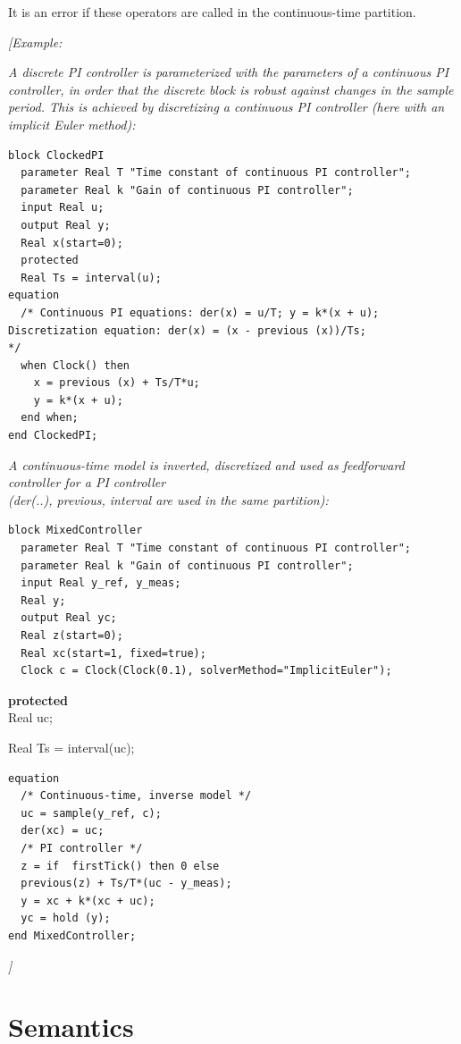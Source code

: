 \documentclass[10pt,a4paper]{report}
\def\doublelabel#1{\label{#1}\hypertarget{#1}{}}
\begin{document}
It is an error if these operators are called in the continuous-time
partition.

\emph{{[}Example:}

\emph{A discrete PI controller is parameterized with the parameters of a
continuous PI controller, in order that the discrete block is robust
against changes in the sample period. This is achieved by discretizing a
continuous PI controller (here with an implicit Euler method):}

\begin{lstlisting}[language=modelica]
block ClockedPI
  parameter Real T "Time constant of continuous PI controller";
  parameter Real k "Gain of continuous PI controller";
  input Real u;
  output Real y;
  Real x(start=0);
  protected
  Real Ts = interval(u);
equation
  /* Continuous PI equations: der(x) = u/T; y = k*(x + u);
Discretization equation: der(x) = (x - previous (x))/Ts;
*/
  when Clock() then
    x = previous (x) + Ts/T*u;
    y = k*(x + u);
  end when;
end ClockedPI;
\end{lstlisting}
\emph{A continuous-time model is inverted, discretized and used as
feedforward controller for a PI controller\\
(der(..), previous, interval are used in the same partition):}

\begin{lstlisting}[language=modelica]
block MixedController
  parameter Real T "Time constant of continuous PI controller";
  parameter Real k "Gain of continuous PI controller";
  input Real y_ref, y_meas;
  Real y;
  output Real yc;
  Real z(start=0);
  Real xc(start=1, fixed=true);
  Clock c = Clock(Clock(0.1), solverMethod="ImplicitEuler");
\end{lstlisting}
\textbf{protected\\
} Real uc;

Real Ts = interval(uc);

\begin{lstlisting}[language=modelica]
equation
  /* Continuous-time, inverse model */
  uc = sample(y_ref, c);
  der(xc) = uc;
  /* PI controller */
  z = if  firstTick() then 0 else
  previous(z) + Ts/T*(uc - y_meas);
  y = xc + k*(xc + uc);
  yc = hold (y);
end MixedController;
\end{lstlisting}
\emph{{]}}

\section{Semantics}\doublelabel{semantics}
\end{document}
